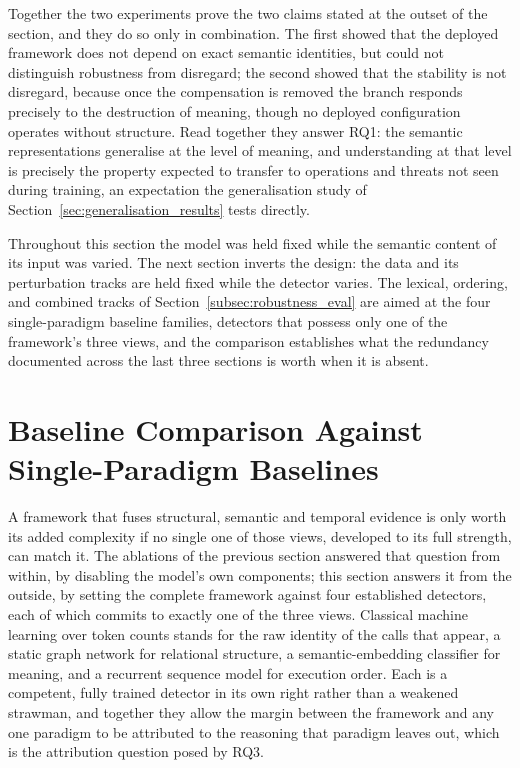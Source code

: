 \documentclass[%
    BCOR=10mm,
    DIV=13,
    toc=bibliography,
    toc=listof,
    oneside,
    12pt,
]{scrbook}
\begin{document}
Together the two experiments prove the two claims stated at the outset of
the section, and they do so only in combination. The first showed that the
deployed framework does not depend on exact semantic identities, but could
not distinguish robustness from disregard; the second showed that the
stability is not disregard, because once the compensation is removed the
branch responds precisely to the destruction of meaning, though no deployed
configuration operates without structure. Read together they answer RQ1: the
semantic representations generalise at the level of meaning, and
understanding at that level is precisely the property expected to transfer
to operations and threats not seen during training, an expectation the
generalisation study of Section~\ref{sec:generalisation_results} tests
directly.

Throughout this section the model was held fixed while the semantic content
of its input was varied. The next section inverts the design: the data and
its perturbation tracks are held fixed while the detector varies. The
lexical, ordering, and combined tracks of
Section~\ref{subsec:robustness_eval} are aimed at the four single-paradigm
baseline families, detectors that possess only one of the framework's three
views, and the comparison establishes what the redundancy documented across
the last three sections is worth when it is absent.


\section{Baseline Comparison Against Single-Paradigm Baselines}
\label{sec:baseline_comparison}

A framework that fuses structural, semantic and temporal evidence is only worth
its added complexity if no single one of those views, developed to its full
strength, can match it. The ablations of the previous section answered that
question from within, by disabling the model's own components; this section
answers it from the outside, by setting the complete framework against four
established detectors, each of which commits to exactly one of the three views.
Classical machine learning over token counts stands for the raw identity of the
calls that appear, a static graph network for relational structure, a
semantic-embedding classifier for meaning, and a recurrent sequence model for
execution order. Each is a competent, fully trained detector in its own right
rather than a weakened strawman, and together they allow the margin between the
framework and any one paradigm to be attributed to the reasoning that paradigm
leaves out, which is the attribution question posed by RQ3.
\end{document}
